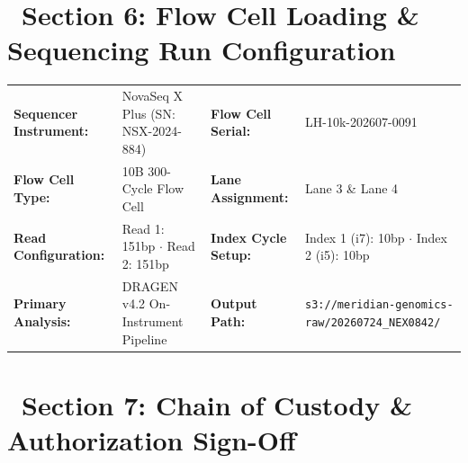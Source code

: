 \documentclass[10pt,a4paper]{article}
\begin{document}
\par
\vspace{8pt}

\section{\faCogs\ Section 6: Flow Cell Loading \& Sequencing Run Configuration}

\begin{tcolorbox}[
  enhanced,
  colback=LightBg,
  colframe=BorderGray,
  arc=2pt,
  boxrule=0.5pt,
  top=6pt, bottom=6pt, left=8pt, right=8pt
]
  \fontsize{8.5pt}{11.5pt}\selectfont
  \begin{tabularx}{\linewidth}{@{}l X l X@{}}
    \textbf{Sequencer Instrument:} & NovaSeq X Plus (SN: NSX-2024-884) & \textbf{Flow Cell Serial:} & LH-10k-202607-0091 \\
    \textbf{Flow Cell Type:} & 10B 300-Cycle Flow Cell & \textbf{Lane Assignment:} & Lane 3 \& Lane 4 \\
    \textbf{Read Configuration:} & Read 1: 151bp \ensuremath{\cdot} Read 2: 151bp & \textbf{Index Cycle Setup:} & Index 1 (i7): 10bp \ensuremath{\cdot} Index 2 (i5): 10bp \\
    \textbf{Primary Analysis:} & DRAGEN v4.2 On-Instrument Pipeline & \textbf{Output Path:} & {\fontsize{6.5pt}{7.5pt}\selectfont\texttt{s3://meridian-genomics-raw/20260724\_NEX0842/}} \\
  \end{tabularx}
\end{tcolorbox}

\vspace{10pt}

\section{\faPen\ Section 7: Chain of Custody \& Authorization Sign-Off}
\end{document}

